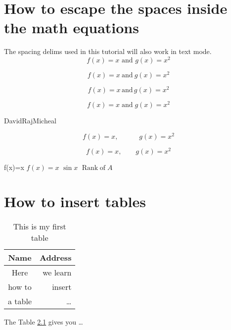\documentclass{report}
\DeclareMathOperator{\rank}{Rank\;of}
\begin{document}
\chapter{How to escape the spaces inside the math equations}\label{ch:escapeSpaces}
The spacing delims used in this tutorial will also work in text mode. 
\begin{equation}
f (x) = x \text{ and } g(x) = x^2
\end{equation}

\begin{equation}
f (x) = x \ \text{and}\ g(x) = x^2
\end{equation}


\begin{equation}
f (x) = x \, \text{and}\, g(x) = x^2
\end{equation}

\begin{equation}
f (x) = x \; \text{and}\; g(x) = x^2
\end{equation}

David\;Raj\;Micheal 

\begin{equation}
f (x) = x, \quad \quad \quad  g(x) = x^2
\end{equation}

\begin{equation}
f (x) = x, \qquad  g(x) = x^2
\end{equation}


f(x)=x $f(x)=x$ $\sin x$ $\rank A$

\chapter{How to insert tables}

\begin{table}[htb!]
	\centering 
	\begin{tabular}{|c|r|}
		\hline
		Name & Address \\
		\hline 
		Here & we learn \\
		how to & insert \\
		a table & \dots \\
		\hline 
	\end{tabular}
\caption{This is my first table}
\label{tab:tutorial}
\end{table}


The Table \ref{tab:tutorial} gives you \dots
\end{document}
